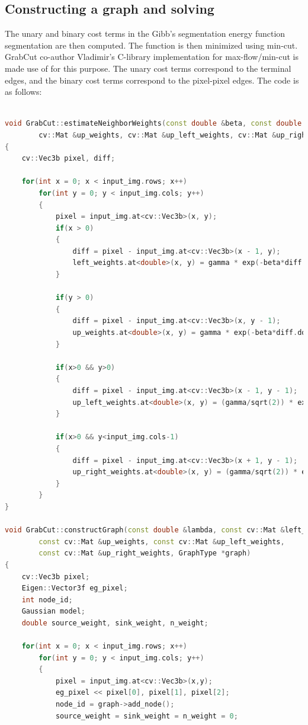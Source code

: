 \documentclass[a4paper,11]{article}
\begin{document}
  \subsection{Constructing a graph and solving}
  
    The unary and binary cost terms in the Gibb's segmentation energy function segmentation are then computed.  The function is then minimized using min-cut. GrabCut co-author Vladimir's C-library implementation for max-flow/min-cut is made use of for this purpose. The unary cost terms correspond to the terminal edges, and the binary cost terms correspond to the pixel-pixel edges. The code is as follows:
    \begin{lstlisting}[language=C++]
    
void GrabCut::estimateNeighborWeights(const double &beta, const double &gamma, cv::Mat &left_weights,
		cv::Mat &up_weights, cv::Mat &up_left_weights, cv::Mat &up_right_weights)
{
	cv::Vec3b pixel, diff;

	for(int x = 0; x < input_img.rows; x++)
		for(int y = 0; y < input_img.cols; y++)
		{
			pixel = input_img.at<cv::Vec3b>(x, y);
			if(x > 0)
			{
				diff = pixel - input_img.at<cv::Vec3b>(x - 1, y);
				left_weights.at<double>(x, y) = gamma * exp(-beta*diff.dot(diff));
			}

			if(y > 0)
			{
				diff = pixel - input_img.at<cv::Vec3b>(x, y - 1);
				up_weights.at<double>(x, y) = gamma * exp(-beta*diff.dot(diff));
			}
			
			if(x>0 && y>0)
			{
				diff = pixel - input_img.at<cv::Vec3b>(x - 1, y - 1);
				up_left_weights.at<double>(x, y) = (gamma/sqrt(2)) * exp(-beta*diff.dot(diff));
			}

			if(x>0 && y<input_img.cols-1)
			{
				diff = pixel - input_img.at<cv::Vec3b>(x + 1, y - 1);
				up_right_weights.at<double>(x, y) = (gamma/sqrt(2)) * exp(-beta*diff.dot(diff));
			}
		}
}

void GrabCut::constructGraph(const double &lambda, const cv::Mat &left_weights,
		const cv::Mat &up_weights, const cv::Mat &up_left_weights,
		const cv::Mat &up_right_weights, GraphType *graph)
{
	cv::Vec3b pixel;
	Eigen::Vector3f eg_pixel;
	int node_id;
	Gaussian model;
	double source_weight, sink_weight, n_weight;

	for(int x = 0; x < input_img.rows; x++)
		for(int y = 0; y < input_img.cols; y++)
		{
			pixel = input_img.at<cv::Vec3b>(x,y);
			eg_pixel << pixel[0], pixel[1], pixel[2];
			node_id = graph->add_node();
			source_weight = sink_weight = n_weight = 0;


\end{lstlisting}
\end{document}
